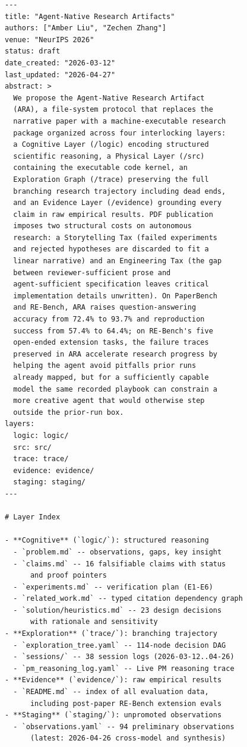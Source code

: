 \begin{lstlisting}[basicstyle=\ttfamily\scriptsize]
---
title: "Agent-Native Research Artifacts"
authors: ["Amber Liu", "Zechen Zhang"]
venue: "NeurIPS 2026"
status: draft
date_created: "2026-03-12"
last_updated: "2026-04-27"
abstract: >
  We propose the Agent-Native Research Artifact
  (ARA), a file-system protocol that replaces the
  narrative paper with a machine-executable research
  package organized across four interlocking layers:
  a Cognitive Layer (/logic) encoding structured
  scientific reasoning, a Physical Layer (/src)
  containing the executable code kernel, an
  Exploration Graph (/trace) preserving the full
  branching research trajectory including dead ends,
  and an Evidence Layer (/evidence) grounding every
  claim in raw empirical results. PDF publication
  imposes two structural costs on autonomous
  research: a Storytelling Tax (failed experiments
  and rejected hypotheses are discarded to fit a
  linear narrative) and an Engineering Tax (the gap
  between reviewer-sufficient prose and
  agent-sufficient specification leaves critical
  implementation details unwritten). On PaperBench
  and RE-Bench, ARA raises question-answering
  accuracy from 72.4% to 93.7% and reproduction
  success from 57.4% to 64.4%; on RE-Bench's five
  open-ended extension tasks, the failure traces
  preserved in ARA accelerate research progress by
  helping the agent avoid pitfalls prior runs
  already mapped, but for a sufficiently capable
  model the same recorded playbook can constrain a
  more creative agent that would otherwise step
  outside the prior-run box.
layers:
  logic: logic/
  src: src/
  trace: trace/
  evidence: evidence/
  staging: staging/
---

# Layer Index

- **Cognitive** (`logic/`): structured reasoning
  - `problem.md` -- observations, gaps, key insight
  - `claims.md` -- 16 falsifiable claims with status
      and proof pointers
  - `experiments.md` -- verification plan (E1-E6)
  - `related_work.md` -- typed citation dependency graph
  - `solution/heuristics.md` -- 23 design decisions
      with rationale and sensitivity
- **Exploration** (`trace/`): branching trajectory
  - `exploration_tree.yaml` -- 114-node decision DAG
  - `sessions/` -- 38 session logs (2026-03-12..04-26)
  - `pm_reasoning_log.yaml` -- Live PM reasoning trace
- **Evidence** (`evidence/`): raw empirical results
  - `README.md` -- index of all evaluation data,
      including post-paper RE-Bench extension evals
- **Staging** (`staging/`): unpromoted observations
  - `observations.yaml` -- 94 preliminary observations
      (latest: 2026-04-26 cross-model and synthesis)
\end{lstlisting}

